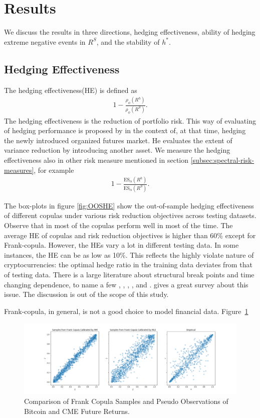 \section{Results}
We discuss the results in three directions, hedging effectiveness,
ability of hedging extreme negative events in $R^S$, and the stability of $h^*$.

\subsection{Hedging Effectiveness}
The hedging effectiveness(HE) is defined as
\begin{align}
  1- \frac{\rho_\phi(R^h)}{\rho_\phi(R^S)}.
  \end{align}
The hedging effectiveness is the reduction of portfolio risk.
This way of evaluating of hedging performance is proposed by \cite{ederington1979hedging} in the context of, at that time, hedging the newly introduced
organized futures market.
He evaluates the extent of variance reduction by introducing another asset.
We measure the hedging effectiveness also in other risk measure mentioned in section \ref{subsec:spectral-risk-measures},
for example
\begin{align}
  1- \frac{\text{ES}_\alpha(R^h)}{\text{ES}_\alpha(R^S)}.
  \end{align}

The box-plots in figure \ref{fig:OOSHE} show the out-of-sample hedging effectiveness of different copulas under various risk
reduction objectives across testing datasets.
Observe that in most of the copulas perform well in most of the time.
The average HE of copulas and risk reduction objectives is higher than 60\% except for Frank-copula.
However, the HEs vary a lot in different testing data.
In some instances, the HE can be as low as 10\%.
This reflects the highly violate nature of cryptocurrencies:
the optimal hedge ratio in the training data deviates from that of testing data.
There is a large literature about structural break points and time changing dependence, to name a few
\citet{hafner2012dynamic}, \citet{patton2006modelling}, \citet{creal2008general},
\citet{engle2002dynamic}, and \citet{giacomini2009inhomogeneous}.
\citet{manner2012survey} gives a great survey about this issue.
The discussion is out of the scope of this study.\medskip

Frank-copula, in general, is not a good choice to model financial data.
Figure~\ref{fig:Frank}

\begin{figure}[th]
   \centering
   \includegraphics[width=\textwidth]{_pics/Frank.png}
   \caption{Comparison of Frank Copula Samples and Pseudo Observations of Bitcoin and CME Future Returns.
   }
   \label{fig:Frank}
\end{figure}

